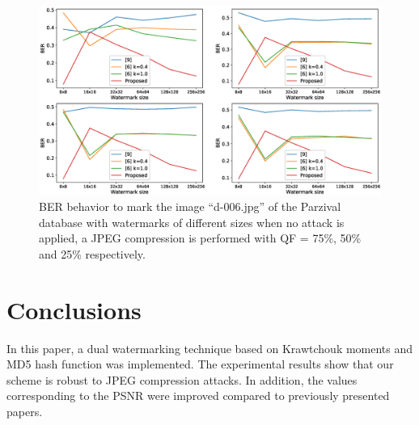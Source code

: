\documentclass[runningheads]{llncs}
\begin{document}
\begin{figure}
	\begin{center}
		\includegraphics[width=1.1\textwidth]{BERwsizeParzival.eps}
		\caption{BER behavior to mark the image ``d-006.jpg'' of the Parzival database with watermarks of different sizes when no attack is applied, a JPEG compression is performed with QF = 75\%, 50\% and 25\% respectively.} \label{berwsizeParzival}
	\end{center}
\end{figure}

\section{Conclusions}
In this paper, a dual watermarking technique based on Krawtchouk moments and MD5 hash function was implemented. The experimental results show that our scheme is robust to JPEG compression attacks. In addition, the values corresponding to the PSNR were improved compared to previously presented papers.
%
%
%


%
\end{document}
